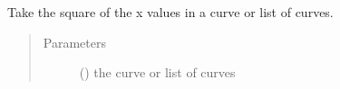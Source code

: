 \documentclass[letterpaper,10pt,english]{sphinxmanual}
\begin{document}
\begin{fulllineitems}
\label{\detokenize{pydv:pydvpy.sqrx}}
Take the square of the x values in a curve or list of curves.
\begin{quote}\begin{description}
\item[{Parameters}] \leavevmode
{} () \textendash{} the curve or list of curves

\end{description}\end{quote}

\end{fulllineitems}

\end{document}
